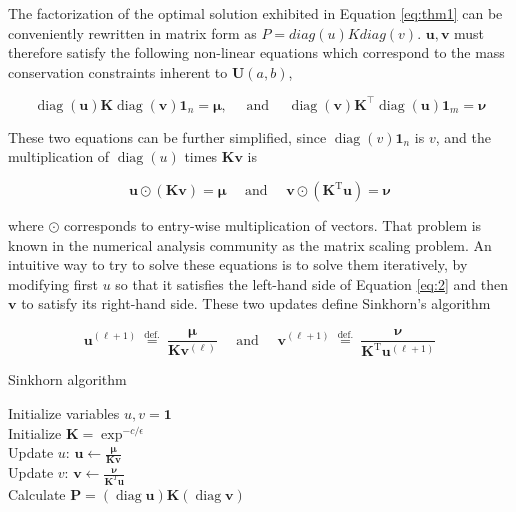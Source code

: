 The factorization of the optimal solution exhibited in Equation \ref{eq:thm1} can be conveniently rewritten in
matrix form as $P = diag(u)K diag(v)$. $\mathbf{u}, \mathbf{v}$ must therefore satisfy the following non-linear equations which
correspond to the mass conservation constraints inherent to $\mathbf{U}(a, b)$,

\begin{equation}
\operatorname{diag}(\mathbf{u}) \mathbf{K} \operatorname{diag}(\mathbf{v}) \mathbf{1}_{n}=\mathbf{\mu}, \quad \text { and } \quad \operatorname{diag}(\mathbf{v}) \mathbf{K}^{\top} \operatorname{diag}(\mathbf{u}) \mathbf{1}_{m}=\mathbf{\nu}
\end{equation}

These two equations can be further simplified, since $\operatorname{diag}(v) \mathbf{1}_n$ is $v$, and the multiplication of $\operatorname{diag}(u)$ times $\mathbf{Kv}$ is

\begin{equation}
  \label{eq:2}
  \mathbf{u} \odot(\mathbf{K} \mathbf{v})=\mathbf{\mu} \quad \text { and } \quad \mathbf{v} \odot\left(\mathbf{K}^{\mathrm{T}} \mathbf{u}\right)=\mathbf{\nu}
\end{equation}

where $\odot$ corresponds to entry-wise multiplication of vectors. That problem is known in the numerical analysis
community as the matrix scaling problem. An intuitive way to try to solve these equations is to solve them iteratively, by modifying first $u$ so that it satisfies the left-hand side of
Equation \ref{eq:2} and then $\mathbf{v}$ to satisfy its right-hand side. These two updates define Sinkhorn's algorithm

\begin{equation}
  \label{eq:sinkhorn}
  \mathbf{u}^{(\ell+1)} \stackrel{\text { def. }}{=} \frac{\mathbf{\mu}}{\mathbf{K} \mathbf{v}^{(\ell)}} \quad \text { and } \quad \mathbf{v}^{(\ell+1)} \stackrel{\text { def. }}{=} \frac{\mathbf{\nu}}{\mathbf{K}^{\mathrm{T}} \mathbf{u}^{(\ell+1)}}
\end{equation}

\vspace{2ex}
    \begin{algorithm}[htbp]
        \SetAlgoNoLine
        \caption{Sinkhorn algorithm} 
        Initialize variables $u, v = \boldsymbol{1}$\\
        Initialize  $\mathbf{K} = \exp^{-c/\epsilon}$\\
        {  
          Update $u$: $\boldsymbol{u} \leftarrow \frac{\mathbf{\mu}}{\mathbf{K} \mathbf{v}}$\\
          Update $v$: $\boldsymbol{v} \leftarrow \frac{\mathbf{\nu}}{\mathbf{K}^T \mathbf{u}}$\\

        }
        Calculate $\mathbf{P} = (\operatorname{diag}{\mathbf{u}}) \mathbf{K} (\operatorname{diag}{\mathbf{v}})$\\
    \end{algorithm}



